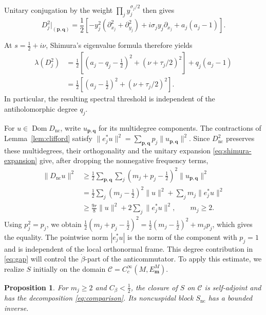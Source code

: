 \documentclass[11pt]{article}
\theoremstyle{definition}
\theoremstyle{plain}
\numberwithin{equation}{section}
\newtheorem{proposition}[theorem]{Proposition}
\newcommand{\nc}{\mathrm{nc}}
\begin{document}
Unitary conjugation by the weight
$\prod_j y_j^{\sigma_j/2}$ then gives
\begin{equation}\label{eq:dirac-laplacian}
D_j^2\big|_{(\boldsymbol p,\boldsymbol q)}
=\frac12\left[
-y_j^2(\partial_{x_j}^2+\partial_{y_j}^2)
+i\sigma_j y_j\partial_{x_j}
+a_j(a_j-1)
\right].
\end{equation}

At $s=\tfrac12+i\nu$, Shimura's eigenvalue formula
\cite[(4.2)]{Shimura} therefore yields
\[
\begin{aligned}
\lambda(D_j^2)
&=\frac12\left[
(a_j-q_j-\tfrac12)^2
+(\nu+\tau_j/2)^2
\right]+q_j(a_j-1)\\
&=\frac12\left[
(a_j-\tfrac12)^2
+(\nu+\tau_j/2)^2
\right].
\end{aligned}
\]
In particular, the resulting spectral threshold is
independent of the antiholomorphic degree $q_j$.


For $u\in\operatorname{Dom}D_{\nc}$, write $u_{\boldsymbol p,\boldsymbol q}$
for its multidegree components. The contractions of
Lemma~\ref{lem:clifford} satisfy
$\|e_j^*u\|^2=\sum_{\boldsymbol p,\boldsymbol q}
p_j\|u_{\boldsymbol p,\boldsymbol q}\|^2$.
Since $D_{\nc}^2$ preserves these multidegrees, their orthogonality
and the unitary expansion \eqref{eq:shimura-expansion} give,
after dropping the nonnegative frequency terms,
\begin{equation}\label{eq:gap}
 \begin{aligned}
 \|D_{\nc}u\|^2
 &\geq\frac12\sum_{\boldsymbol p,\boldsymbol q}\sum_j
       (m_j+p_j-\tfrac12)^2
       \|u_{\boldsymbol p,\boldsymbol q}\|^2\\
 &=\frac12\sum_j(m_j-\tfrac12)^2\|u\|^2
       +\sum_jm_j\|e_j^*u\|^2\\
 &\geq\frac{9r}{8}\|u\|^2+2\sum_j\|e_j^*u\|^2,
 \qquad m_j\geq2.
 \end{aligned}
\end{equation}
Using $p_j^2=p_j$, we obtain
$\frac12(m_j+p_j-\tfrac12)^2
=\frac12(m_j-\tfrac12)^2+m_jp_j$,
which gives the equality. The pointwise norm $|e_j^*u|$ is the
norm of the component with $p_j=1$ and is independent of the
local orthonormal frame. This degree contribution in \eqref{eq:gap}
will control the $\dot\beta$-part of the anticommutator.
To apply this estimate, we realize $S$ initially on the domain
$\mathcal C=C_c^\infty(M,E_{\boldsymbol m}^{M})$.

\begin{proposition}\label{prop:invertibility}
For $m_j\geq2$ and $C_\beta<\tfrac12$, the closure of $S$ on
$\mathcal C$ is self-adjoint and has the decomposition
\eqref{eq:comparison}. Its noncuspidal block $S_{\nc}$ has a
bounded inverse.
\end{proposition}
\end{document}
